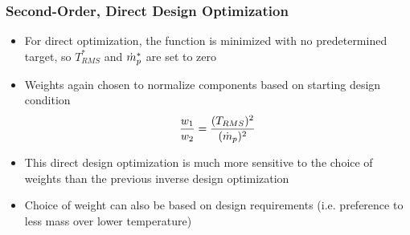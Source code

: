 \documentclass{beamer}
\begin{document}
\begin{frame}
  \frametitle{Second-Order, Direct Design Optimization}
  \begin{itemize}
    \item For direct optimization, the function is minimized with no
      predetermined target, so $T_{RMS}^*$ and $\dot{m}_p^*$ are set to zero
    \item Weights again chosen to normalize components based on starting design
      condition
      \[
        \frac{w_1}{w_2} = \frac{(T_{RMS})^2}{(\dot{m}_p)^2}
      \]
    \item This direct design optimization is much more sensitive to the choice of
      weights than the previous inverse design optimization
    \item Choice of weight can also be based on design requirements (i.e.
      preference to less mass over lower temperature)
  \end{itemize}
\end{frame}
\end{document}
